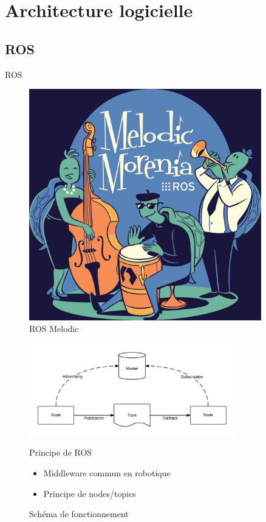 \documentclass[pdftex,beamer,aspectratio=169]{beamer}
\theoremstyle{definition}
\theoremstyle{example}
\theoremstyle{plain}
\begin{document}
\section{Architecture logicielle}
\subsection{ROS}
\begin{frame}[fragile]{ROS}
  \centering
  \begin{minipage}{0.3\textwidth}
    \begin{figure}
      \centering
      \includegraphics[width=0.9\textwidth]{melodic.png}
      \caption{ROS Melodic}
    \end{figure}
  \end{minipage}\hfill
  \begin{minipage}{0.65\textwidth}
    \begin{figure}
      \centering
      \includegraphics[width=0.8\textwidth]{ROS-master-node-topic.png}
      \caption{Schéma de fonctionnement}

    \begin{exampleblock}{Principe de ROS}
      \begin{itemize}
        \item Middleware commun en robotique
        \item Principe de nodes/topics
      \end{itemize}
    \end{exampleblock}
    \end{figure}
  \end{minipage}
\end{frame}
\end{document}
